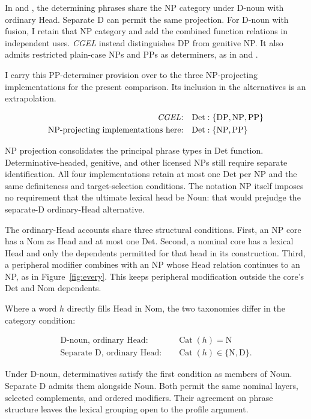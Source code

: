 \documentclass[12pt]{article}
\begin{document}
In  and , the determining phrases share the NP category under D-noun with ordinary Head. Separate D can permit the same projection. For D-noun with fusion, I retain that NP category and add the combined function relations in independent uses. \textit{CGEL} instead distinguishes DP from genitive NP. It also admits restricted plain-case NPs and PPs as determiners, as in  and  \citep[Ch.~5, §4]{huddleston2002}.

I carry this PP-determiner provision over to the three NP-projecting implementations for the present comparison. Its inclusion in the alternatives is an extrapolation.

\[
\begin{aligned}
\text{\textit{CGEL}:} &\quad \mathrm{Det}:\{\mathrm{DP},\mathrm{NP},\mathrm{PP}\} \\
\text{NP-projecting implementations here:} &\quad \mathrm{Det}:\{\mathrm{NP},\mathrm{PP}\}
\end{aligned}
\]

NP projection consolidates the principal phrase types in Det function. Determinative-headed, genitive, and other licensed NPs still require separate identification. All four implementations retain at most one Det per NP and the same definiteness and target-selection conditions. The notation NP itself imposes no requirement that the ultimate lexical head be Noun: that would prejudge the separate-D ordinary-Head alternative.

The ordinary-Head accounts share three structural conditions. First, an NP core has a Nom as Head and at most one Det. Second, a nominal core has a lexical Head and only the dependents permitted for that head in its construction. Third, a peripheral modifier combines with an NP whose Head relation continues to an NP, as in Figure~\ref{fig:every}. This keeps peripheral modification outside the core's Det and Nom dependents.

Where a word $h$ directly fills Head in Nom, the two taxonomies differ in the category condition:

\[
\begin{aligned}
\text{D-noun, ordinary Head:} &\quad \operatorname{Cat}(h)=\mathrm{N} \\
\text{Separate D, ordinary Head:} &\quad \operatorname{Cat}(h)\in\{\mathrm{N},\mathrm{D}\}.
\end{aligned}
\]

Under D-noun, determinatives satisfy the first condition as members of Noun. Separate D admits them alongside Noun. Both permit the same nominal layers, selected complements, and ordered modifiers. Their agreement on phrase structure leaves the lexical grouping open to the profile argument.
\end{document}
